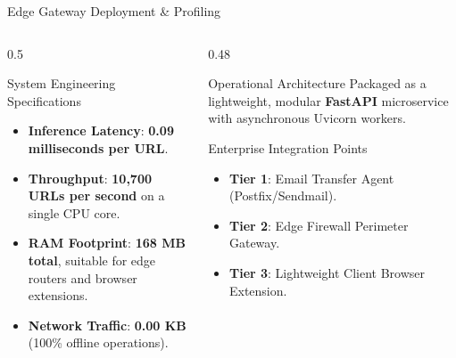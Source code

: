 \documentclass[aspectratio=169,10pt]{beamer}
\begin{document}
\begin{frame}{Edge Gateway Deployment \& Profiling}
    \begin{columns}[T]
        \begin{column}{0.5\textwidth}
            \begin{block}{System Engineering Specifications}
                \begin{itemize}
                    \item \textbf{Inference Latency}: \textbf{0.09 milliseconds per URL}.
                    \item \textbf{Throughput}: \textbf{10,700 URLs per second} on a single CPU core.
                    \item \textbf{RAM Footprint}: \textbf{168 MB total}, suitable for edge routers and browser extensions.
                    \item \textbf{Network Traffic}: \textbf{0.00 KB} (100\% offline operations).
                \end{itemize}
            \end{block}
        \end{column}
        
        \begin{column}{0.48\textwidth}
            \begin{exampleblock}{Operational Architecture}
                Packaged as a lightweight, modular \textbf{FastAPI} microservice with asynchronous Uvicorn workers.
            \end{exampleblock}
            \begin{block}{Enterprise Integration Points}
                \begin{itemize}
                    \item \textbf{Tier 1}: Email Transfer Agent (Postfix/Sendmail).
                    \item \textbf{Tier 2}: Edge Firewall Perimeter Gateway.
                    \item \textbf{Tier 3}: Lightweight Client Browser Extension.
                \end{itemize}
            \end{block}
        \end{column}
    \end{columns}
\end{frame}
\end{document}
